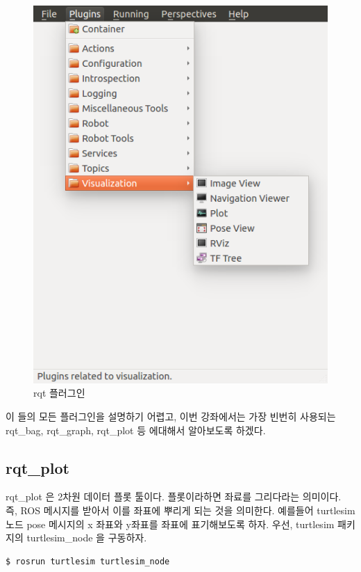\begin{figure}[h]
\centering\includegraphics[width=0.8\columnwidth]{pictures/chapter6/rqt_plugin.png}
\caption{rqt 플러그인}
\end{figure}

\vspace{\baselineskip}
\noindent
이 들의 모든 플러그인을 설명하기 어렵고, 이번 강좌에서는 가장 빈번히 사용되는 rqt\_bag, rqt\_graph, rqt\_plot 등 에대해서 알아보도록 하겠다.

\subsection{rqt\_plot}

rqt\_plot 은 2차원 데이터 플롯 툴이다. 플롯이라하면 좌료를 그리다라는 의미이다. 즉, ROS 메시지를 받아서 이를 좌표에 뿌리게 되는 것을 의미한다. 예를들어 turtlesim 노드 pose 메시지의 x 좌표와  y좌표를 좌표에 표기해보도록 하자. 우선, turtlesim 패키지의 turtlesim\_node 을 구동하자.

\begin{lstlisting}[language=ROS]
$ rosrun turtlesim turtlesim_node 
\end{lstlisting}

